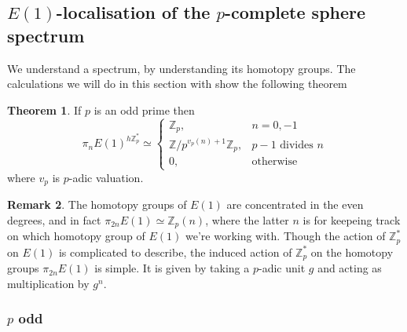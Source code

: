 \documentclass[a4paper]{article} %
\theoremstyle{definition}
\newtheorem{theorem}{Theorem} %
\newtheorem{remark}[theorem]{Remark}
\newcommand{\Z}{\mathbb{Z}}
\begin{document}
\subsection{$E(1)$-localisation of the $p$-complete sphere spectrum}

We understand a spectrum, by understanding its homotopy groups. The calculations we will do in this section with show the following theorem
\begin{theorem}
 If $p$ is an odd prime  then
 \[
  \pi_n E(1)^{h\Z_p^*} \simeq
    \begin{cases}
    \Z_p, & n=0,-1 \\
    \Z/p^{v_p(n)+1}\Z_p, & p-1 \text{ divides } n \\
    0, & \text{otherwise}
    \end{cases}
  \]
  where $v_p$ is $p$-adic valuation.
\end{theorem}

\begin{remark}
  The homotopy groups of $E(1)$ are concentrated in the even degrees, and in fact $\pi_{2n}E(1) \simeq \Z_p(n)$, where the latter $n$ is for keepeing track on which homotopy group of $E(1)$ we're working with. Though the action of $\Z_p^*$ on $E(1)$ is complicated to describe, the induced action of $\Z_p^*$ on the homotopy groups $\pi_{2n}E(1)$ is simple. It is given by taking a $p$-adic unit $g$ and acting as multiplication by $g^n$.
\end{remark}

\subsubsection{$p$ odd}
\end{document}
